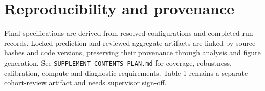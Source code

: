 \documentclass[11pt]{article}
\begin{document}
\section{Reproducibility and provenance}
Final specifications are derived from resolved configurations and completed
run records. Locked prediction and reviewed aggregate artifacts are linked by
source hashes and code versions, preserving their provenance through analysis
and figure generation.
See \texttt{SUPPLEMENT\_CONTENTS\_PLAN.md} for coverage, robustness, calibration,
compute and diagnostic requirements. Table 1 remains a separate cohort-review
artifact and needs supervisor sign-off.
\end{document}
